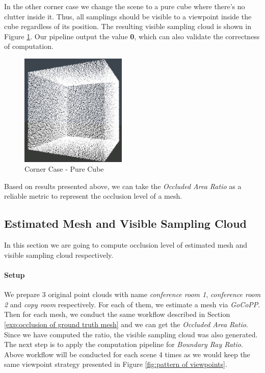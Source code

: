 \documentclass[11pt, a4paper,oneside,chapterprefix=false]{scrbook}
\begin{document}
In the other corner case we change the scene to a pure cube where there's no clutter inside it. Thus, all samplings should be visible to a viewpoint inside the cube regardless of its position. The resulting visible sampling cloud is shown in Figure \ref{fig:corner case pure cube}. Our pipeline output the value \textbf{0}, which can also validate the correctness of computation. 

\begin{figure}[H]
    \centering
    \includegraphics*[width=0.45\textwidth]{figures/cube with all samples.png}
    \caption{Corner Case - Pure Cube}
    \label{fig:corner case pure cube}
\end{figure}

Based on results presented above, we can take the \textit{Occluded Area Ratio} as a reliable metric to represent the occlusion level of a mesh.

\subsection{Estimated Mesh and Visible Sampling Cloud}

In this section we are going to compute occlusion level of estimated mesh and visible sampling cloud respectively. 

\paragraph{Setup}

We prepare 3 original point clouds with name \textit{conference room 1}, \textit{conference room 2} and \textit{copy room} respectively. For each of them, we estimate a mesh via \textit{GoCoPP}. Then for each mesh, we conduct the same workflow described in Section \ref{exp:occlusion of ground truth mesh} and we can get the \textit{Occluded Area Ratio}. Since we have computed the ratio, the visible sampling cloud was also generated. The next step is to apply the computation pipeline for \textit{Boundary Ray Ratio}. Above workflow will be conducted for each scene 4 times as we would keep the same viewpoint strategy presented in Figure \ref{fig:pattern of viewpoints}.    
\end{document}
